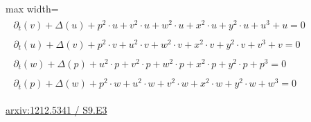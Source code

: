 \documentclass[10pt,a4paper]{article}
\begin{document}
\begin{minipage}{\linewidth}
\begin{center}\begin{adjustbox}{max width=\linewidth}$\displaystyle\begin{gathered}\begin{gathered}\partial_{t}(v)+\Delta(u)+p^{2}\cdot u+v^{2}\cdot u+w^{2}\cdot u+x^{2}\cdot u+y^{2}\cdot u+u^{3}+u=0\end{gathered}\\[5pt]\begin{gathered}\partial_{t}(u)+\Delta(v)+p^{2}\cdot v+u^{2}\cdot v+w^{2}\cdot v+x^{2}\cdot v+y^{2}\cdot v+v^{3}+v=0\end{gathered}\\[5pt]\begin{gathered}\partial_{t}(w)+\Delta(p)+u^{2}\cdot p+v^{2}\cdot p+w^{2}\cdot p+x^{2}\cdot p+y^{2}\cdot p+p^{3}=0\end{gathered}\\[5pt]\begin{gathered}\partial_{t}(p)+\Delta(w)+p^{2}\cdot w+u^{2}\cdot w+v^{2}\cdot w+x^{2}\cdot w+y^{2}\cdot w+w^{3}=0\end{gathered}\end{gathered}$\end{adjustbox}\end{center}
{\small \href{https://arxiv.org/html/1212.5341#S9.E3}{arxiv:1212.5341 / S9.E3}}\par
\end{minipage}\par\vspace{7mm}
\end{document}
